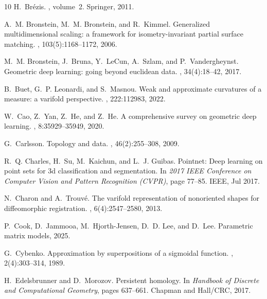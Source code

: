 \documentclass[11pt]{article}
\begin{document}
\begin{thebibliography}{10}
H.~Br{\'e}zis.
, volume~2.
\newblock Springer, 2011.

A.~M. Bronstein, M.~M. Bronstein, and R.~Kimmel.
\newblock Generalized multidimensional scaling: a framework for isometry-invariant partial surface matching.
, 103(5):1168--1172, 2006.

M.~M. Bronstein, J.~Bruna, Y.~LeCun, A.~Szlam, and P.~Vandergheynst.
\newblock Geometric deep learning: going beyond euclidean data.
, 34(4):18--42, 2017.

B.~Buet, G.~P. Leonardi, and S.~Masnou.
\newblock Weak and approximate curvatures of a measure: a varifold perspective.
, 222:112983, 2022.

W.~Cao, Z.~Yan, Z.~He, and Z.~He.
\newblock A comprehensive survey on geometric deep learning.
, 8:35929--35949, 2020.

G.~Carlsson.
\newblock Topology and data.
, 46(2):255--308, 2009.

R.~Q. Charles, H.~Su, M.~Kaichun, and L.~J. Guibas.
\newblock Pointnet: Deep learning on point sets for 3d classification and segmentation.
\newblock In {\em 2017 IEEE Conference on Computer Vision and Pattern Recognition (CVPR)}, page 77–85. IEEE, Jul 2017.

N.~Charon and A.~Trouv{\'e}.
\newblock The varifold representation of nonoriented shapes for diffeomorphic registration.
, 6(4):2547--2580, 2013.

P.~Cook, D.~Jammooa, M.~Hjorth-Jensen, D.~D. Lee, and D.~Lee.
\newblock Parametric matrix models, 2025.

G.~Cybenko.
\newblock Approximation by superpositions of a sigmoidal function.
, 2(4):303--314, 1989.

H.~Edelsbrunner and D.~Morozov.
\newblock Persistent homology.
\newblock In {\em Handbook of Discrete and Computational Geometry}, pages 637--661. Chapman and Hall/CRC, 2017.


\end{thebibliography}
\end{document}
